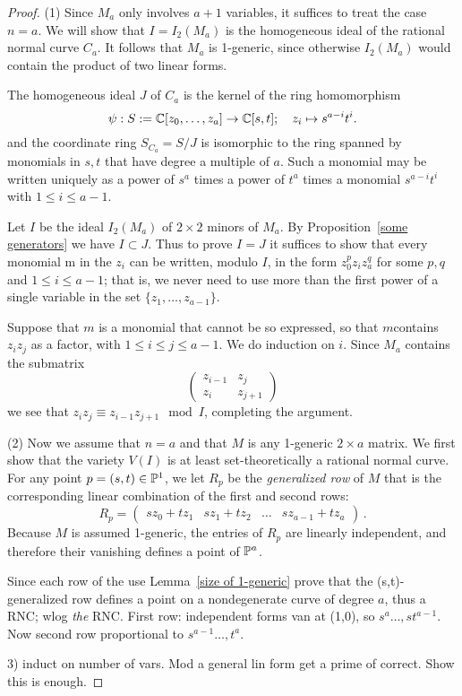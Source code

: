 \begin{proof} (1) Since $M_{a}$ only involves $a+1$ variables, it suffices to treat the case $n=a$. We will show that  $I = I_{2}(M_{a})$ is  the homogeneous ideal of the rational normal curve $C_{a}$. It follows that $M_{a}$ is 1-generic, since otherwise $I_{2}(M_{a})$ would contain the product of two linear forms.

The homogeneous ideal $J$ of $C_{a}$ is the kernel of the ring homomorphism
$$
\psi: S:= \CC[z_0,\dots,z_a] \to \CC[s,t]; \quad z_i \mapsto s^{a-i}t^i.
$$
 and
the coordinate ring $S_{C_{a}} = S/J$ is isomorphic to the ring spanned by
monomials in $s,t$ that have degree a multiple of $a$. Such
a monomial may be written uniquely as a power of
$s^a$
times a power of $t^a$ times a monomial $s^{a-i}t^i$ with $1\leq i\leq a-1$.

Let $I$ be the ideal $I_2(M_a)$ of $2\times 2$ minors of $M_a$. By Proposition~\ref{some generators} we have $I\subset J$. Thus to prove $I=J$ it suffices to show that
every monomial m in the $z_i$ can be written, modulo $I$, in the form
$z_0^pz_iz_a^q$ for some $p,q$ and $1\leq i\leq a-1$; that is, we never need to
use more than the first power of a single variable in the set $\{z_1,\dots, z_{a-1}\}$.

Suppose that $m$ is a monomial that cannot be so expressed, so that $m$contains $z_iz_j$ as a factor, with $1\leq i\leq j\leq a-1$. We do induction on $i$. Since
$M_a$ contains the submatrix
$$
\begin{pmatrix}
 z_{i-1} & z_{j}\\
 z_i & z_{j+1}
\end{pmatrix}
$$
we see that $z_iz_j \equiv z_{i-1}z_{j+1} \mod I$, completing the argument.

(2) Now we assume that $n=a$ and that $M$ is any 1-generic $2\times a$ matrix. We first show that the variety $V(I)$ is at least set-theoretically a rational normal curve. For any point $ p = (s,t) \in \PP^{1}$, we let $R_{p}$ be the 
\emph{generalized row} of $M$ that is the corresponding linear combination of the first and second rows:
$$
R_{p} = 
\begin{pmatrix}
 sz_0+tz_1&sz_1+t z_{2}&\dots&sz_{a-1}+t z_{a}
 \end{pmatrix}\,. 
$$
Because $M$ is assumed 1-generic, the entries of $R_{p}$ are linearly independent, and therefore their vanishing defines a point of $\PP^{a}$.

Since each row of the use Lemma~\ref{size of 1-generic} prove that the (s,t)-generalized row
defines a point on a nondegenerate curve of degree $a$, thus a RNC; wlog \emph{the} RNC. First row: independent
forms van at (1,0), so $s^{a}\dots,st^{a-1}$. Now second row proportional to $s^{a-1}\dots,t^{a}$.

3) induct on number of vars. Mod a general lin form get a prime of correct. Show this is enough.

\end{proof}




